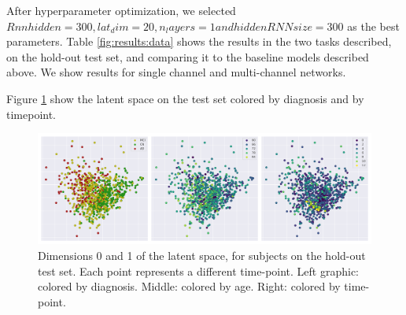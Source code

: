 After hyperparameter optimization, we selected ${Rnn hidden=300, lat_dim = 20, n_layers = 1 and hidden RNN size=300}$ as the best parameters. Table \ref{fig:results:data} shows the results in the two tasks described, on the hold-out test set, and comparing it to the baseline models described above. We show results for single channel and multi-channel networks.

\begin{table}[!htbp]
\centering
{}
\caption[Performance of the model.]{Performance of the models on longitudinal prediction and channel reconstruction, compared to baseline methods. RNN-VAE: single channel model.  MC-RVAE: multiple channel model. All values are mean absolute error (MAE) over each subject and time-point.} \label{table:results:data}
\end{table}

Figure \ref{fig:rnn:latent} show the latent space on the test set colored by diagnosis and by timepoint. \\

\begin{figure}[!htbp]
  \centering
  \includegraphics[width=1.0\textwidth]{figures/rnnvae/latent_space_fig.png}
  \caption[Latent space for the test set.]{Dimensions 0 and 1 of the latent space, for subjects on the hold-out test set. Each point represents a different time-point. Left graphic: colored by diagnosis. Middle: colored by age. Right: colored by time-point.}\label{fig:rnn:latent}
\end{figure}

